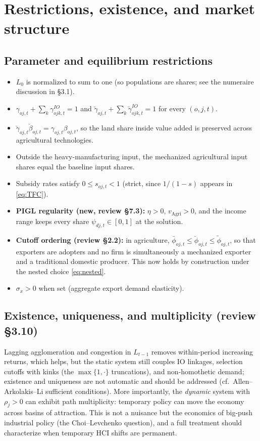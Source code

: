 \documentclass[11pt]{article}
\begin{document}
\section{Restrictions, existence, and market structure}\label{sec:restrictions}
\subsection{Parameter and equilibrium restrictions}
\begin{itemize}[leftmargin=1.5em]
\item $L_0$ is normalized to sum to one (so populations are shares; see the numeraire
      discussion in \S3.1).
\item $\gamma_{oj,t} + \sum_k \gamma^{IO}_{ojk,t} = 1$ and
      $\breve\gamma_{oj,t} + \sum_k \breve\gamma^{IO}_{ojk,t} = 1$ for every $(o,j,t)$.
\item $\breve\gamma_{oj,t}\breve\beta_{oj,t} = \gamma_{oj,t}\beta_{oj,t}$, so the
      land share inside value added is preserved across agricultural technologies.
\item Outside the heavy-manufacturing input, the mechanized agricultural input shares
      equal the baseline input shares.
\item Subsidy rates satisfy $0 \le s_{oj,t} < 1$ (strict, since $1/(1-s)$ appears in
      \eqref{eq:TFC}).
\item \textbf{PIGL regularity (new, review \S7.3):} $\eta>0$, $v_{\mathrm{Agri}}>0$, and the
      income range keeps every share $\psi_{dj,t}\in[0,1]$ at the solution.
\item \textbf{Cutoff ordering (review \S2.2):} in agriculture,
      $\bar\phi_{oj,t}\le\breve\phi_{oj,t}\le\tilde\phi_{oj,t}$, so that exporters are
      adopters and no firm is simultaneously a mechanized exporter and a traditional
      domestic producer. This now holds by construction under the nested choice
      \eqref{eq:nested}.
\item $\sigma_x>0$ when set (aggregate export demand elasticity).
\end{itemize}

\subsection{Existence, uniqueness, and multiplicity (review \S3.10)}\label{sec:existence}
Lagging agglomeration and congestion in $L_{t-1}$ removes within-period increasing returns,
which helps, but the static system still couples IO linkages, selection cutoffs with kinks
(the $\max\{1,\cdot\}$ truncations), and non-homothetic demand; existence and uniqueness
are not automatic and should be addressed (cf.\ Allen--Arkolakis--Li sufficient
conditions). More importantly, the \emph{dynamic} system with $\rho_j>0$ can exhibit path
multiplicity: temporary policy can move the economy across basins of attraction. This is
not a nuisance but the economics of big-push industrial policy (the Choi--Levchenko
question), and a full treatment should characterize when temporary HCI shifts are
permanent.
\end{document}
